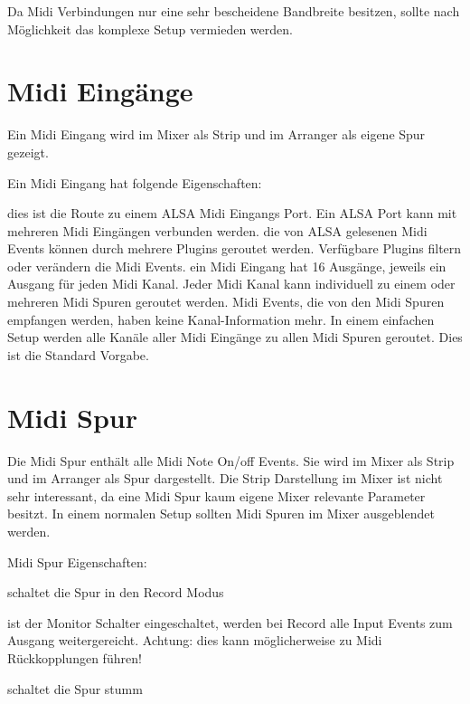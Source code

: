       Da Midi Verbindungen nur eine sehr bescheidene 
      Bandbreite besitzen, sollte nach Möglichkeit das komplexe Setup 
      vermieden werden.
      
  \section{Midi Eingänge}
      Ein Midi Eingang wird im Mixer als Strip und im Arranger als
      eigene Spur gezeigt.

      Ein Midi Eingang hat folgende Eigenschaften:

      \blank[big]
       dies ist die Route zu einem ALSA Midi Eingangs
         Port. Ein ALSA Port kann mit mehreren Midi Eingängen verbunden
         werden.
       die von ALSA gelesenen Midi Events können durch
         mehrere Plugins geroutet werden. Verfügbare Plugins filtern oder
         verändern die Midi Events.
       ein Midi Eingang hat 16 Ausgänge, jeweils ein
         Ausgang für jeden Midi Kanal. Jeder Midi Kanal kann individuell
         zu einem oder mehreren Midi Spuren geroutet werden.
         Midi Events, die von den Midi Spuren empfangen werden, haben
         keine Kanal-Information mehr.
         In einem einfachen Setup werden alle Kanäle aller Midi Eingänge
         zu allen Midi Spuren geroutet. Dies ist die Standard Vorgabe.

      \blank[big]

  \section{Midi Spur}
      Die Midi Spur enthält alle Midi Note On/off Events. Sie wird im
      Mixer als Strip und im Arranger als Spur dargestellt. Die
      Strip Darstellung im Mixer ist nicht sehr interessant, da eine
      Midi Spur kaum eigene Mixer relevante Parameter besitzt. In einem 
      normalen Setup sollten Midi Spuren im Mixer ausgeblendet werden.

      Midi Spur Eigenschaften:

      \blank[big]
       schaltet die Spur in den Record Modus

       ist der Monitor Schalter eingeschaltet, werden
            bei Record alle Input Events zum Ausgang weitergereicht.
            Achtung: dies kann möglicherweise zu Midi Rückkopplungen
            führen!

       schaltet die Spur stumm


